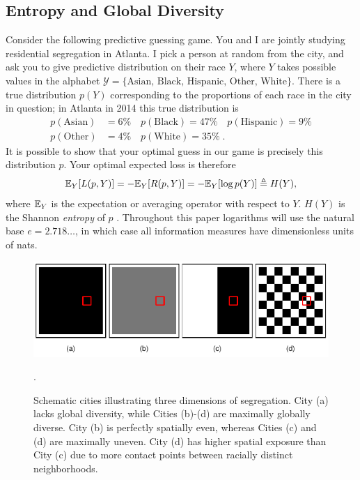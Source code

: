 \documentclass[english]{scrartcl}
\begin{document}
	\subsection{Entropy and Global Diversity}

		Consider the following predictive guessing game. You and I are jointly studying residential segregation in Atlanta. I pick a person at random from the city, and ask you to give predictive distribution on their race $Y$, where $Y$ takes possible values in the alphabet  $\mathcal{Y} = \{\text{Asian, Black, Hispanic, Other, White}\}$. There is a true distribution $p(Y)$ corresponding to the proportions of each race in the city in question; in Atlanta in 2014 this true distribution is 
		\begin{align*}
			p(\text{Asian})    &= 6\% \quad
			p(\text{Black})    = 47\% \quad
			p(\text{Hispanic}) = 9\% \\
			p(\text{Other})    &= 4\% \quad
			p(\text{White})    = 35\%\;. 
		\end{align*}
		It is possible to show that your optimal guess in our game is precisely this distribution $p$. Your optimal expected loss is therefore
		\begin{equation*}
			\mathbb{E}_Y[L(p,Y)] = -\mathbb{E}_Y[R(p,Y)] = -\mathbb{E}_Y[\log p(Y)] \triangleq H(Y), 
		\end{equation*}
		where $\mathbb{E}_Y$ is the expectation or averaging operator with respect to $Y$. $H(Y)$ is the Shannon \emph{entropy} of $p$ \cite{Shannon1948}. Throughout this paper logarithms will use the natural base $e = 2.718\ldots$, in which case all information measures have dimensionless units of nats. 

		\begin{figure}
			\includegraphics[width=\textwidth]{figs/checkerboard.pdf}
			\caption{Schematic cities illustrating three dimensions of segregation. City (a) lacks global diversity, while Cities (b)-(d) are maximally globally diverse. City (b) is perfectly spatially even, whereas Cities (c) and (d) are maximally uneven. City (d) has higher spatial exposure than City (c) due to more contact points between racially distinct neighborhoods.}. \label{fig:checkerboard}
		\end{figure}
\end{document}
